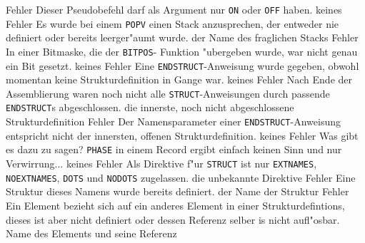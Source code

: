 \documentclass[12pt,a4paper,twoside]{report}
\newcommand{\tty}[1]{{\tt #1}}
\begin{document}
\begin{description}
               {Fehler}
               {Dieser Pseudobefehl darf als Argument nur \tty{ON}
                oder \tty{OFF} haben.}
               {keines}
               {Fehler}
               {Es wurde bei einem \tty{POPV}
                einen Stack anzusprechen, der entweder nie definiert oder
                bereits leerger"aumt wurde.}
               {der Name des fraglichen Stacks}
	       {Fehler}
               {In einer Bitmaske, die der \tty{BITPOS}-
                Funktion "ubergeben wurde, war nicht genau ein Bit
                gesetzt.}
               {keines}
               {Fehler}
               {Eine \tty{ENDSTRUCT}-Anweisung wurde gegeben, obwohl
                momentan keine Strukturdefinition in Gange war.}
               {keines}
               {Fehler}
               {Nach Ende der Assemblierung waren noch nicht alle
                \tty{STRUCT}-Anweisungen durch passende \tty{ENDSTRUCT}s
                abgeschlossen.}
               {die innerste, noch nicht abgeschlossene
                Strukturdefinition}
               {Fehler}
               {Der Namensparameter einer \tty{ENDSTRUCT}-Anweisung
                entspricht nicht der innersten, offenen
                Strukturdefinition.}
               {keines}
               {Fehler}
               {Was gibt es dazu zu sagen?  \tty{PHASE} in einem Record
                ergibt einfach keinen Sinn und nur Verwirrung...}
               {keines}
\errentry{1554}{ung"ultige \tty{STRUCT}-Direktive}
               {Fehler}
               {Als Direktive f"ur \tty{STRUCT} ist nur
                \tty{EXTNAMES}, \tty{NOEXTNAMES}, \tty{DOTS} und
                \tty{NODOTS} zugelassen.}
               {die unbekannte Direktive}
               {Fehler}
               {Eine Struktur dieses Namens wurde bereits definiert.}
               {der Name der Struktur}
               {Fehler}
               {Ein Element bezieht sich auf ein anderes Element in
                einer Strukturdefintions, dieses ist aber nicht
                definiert oder dessen Referenz selber is nicht
                aufl"osbar.}
               {Name des Elements und seine Referenz}

\end{description}
\end{document}
